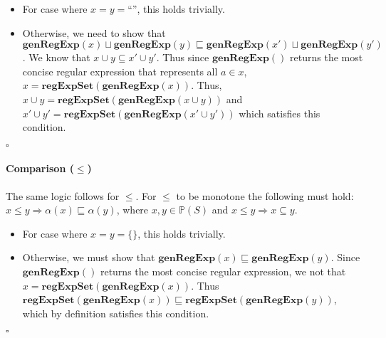 \documentclass{article}
\newcommand{\powerset}[1]{\mathbb{P}(#1)}
\newcommand{\regExpSet}[1]{\mathbf{regExpSet}(#1)}
\newcommand{\genRegExp}[1]{\mathbf{genRegExp}(#1)}
\begin{document}
\begin{itemize}
	\item For case where $x = y = \text{``''}$, this holds trivially.
	\item Otherwise, we need to show that $\genRegExp{x} \sqcup \genRegExp{y} \sqsubseteq  \genRegExp{x'} \sqcup \genRegExp{y'}$.  We know that $x \cup y \subseteq x' \cup y'$.  Thus since $\genRegExp{}$ returns the most concise regular expression that represents all $a \in x$, $x = \regExpSet{\genRegExp{x}}$. Thus, $x \cup y = \regExpSet{\genRegExp{x \cup y}}$ and $x' \cup y' = \regExpSet{\genRegExp{x' \cup y'}}$ which satisfies this condition.
\end{itemize}
$\square$

\paragraph{Comparison ($\leq$)}
The same logic follows for $\leq$. For $\leq$ to be monotone the following must hold: $x \leq y \Rightarrow  \alpha(x) \sqsubseteq \alpha(y)$, where $x,y \in \powerset{S}$ and $x \leq y \Rightarrow x \subseteq y$.
\begin{itemize}
	\item For case where $x = y = \{\}$, this holds trivially.
	\item Otherwise, we must show that $\genRegExp{x} \sqsubseteq \genRegExp{y}$. Since $\genRegExp{}$ returns the most concise regular expression, we not that $x = \regExpSet{\genRegExp{x}}$.  Thus $\regExpSet{\genRegExp{x}} \sqsubseteq \regExpSet{\genRegExp{y}}$, which by definition satisfies this condition.
\end{itemize}
$\square$
\end{document}
